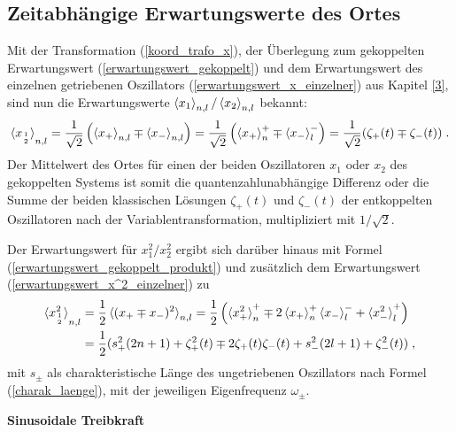   \subsection{Zeitabhängige Erwartungswerte des Ortes}
    Mit der Transformation (\ref{koord_trafo_x}), der Überlegung zum gekoppelten Erwartungswert (\ref{erwartungswert_gekoppelt}) und dem Erwartungswert des einzelnen getriebenen Oszillators (\ref{erwartungswert_x_einzelner}) aus Kapitel \ref{3}, sind nun die Erwartungswerte
    $\braket{x_1}_{n,l}/\braket{x_2}_{n,l}$ bekannt:
    \begin{align}
      \braket{x_{1 \atop 2}}_{n,l}=\frac{1}{\sqrt{2}}\left(\braket{x_+}_{n,l}\mp\braket{x_-}_{n,l}\right)
      =\frac{1}{\sqrt{2}}\left(\braket{x_+}_n^+\mp\braket{x_-}_l^-\right)
      =\frac{1}{\sqrt{2}}(\zeta_+(t)\mp\zeta_-(t)) \; .
    \end{align}
    Der Mittelwert des Ortes für einen der beiden Oszillatoren $x_1$ oder $x_2$ des gekoppelten Systems ist somit die quantenzahlunabhängige Differenz oder die Summe der beiden klassischen Lösungen $\zeta_+(t)$ und $\zeta_-(t)$ der entkoppelten Oszillatoren nach der Variablentransformation, multipliziert mit $1/\sqrt 2$.

    Der Erwartungswert für $x_{1}^2/x_2^2$ ergibt sich darüber hinaus mit Formel (\ref{erwartungswert_gekoppelt_produkt}) und zusätzlich dem Erwartungswert (\ref{erwartungswert_x^2_einzelner}) zu
    \begin{align}
      \braket{x_{1\atop 2}^2}_{n,l}&=\frac{1}{2}\braket{(x_+\mp x_-)^2}_{n,l}
      =\frac{1}{2}\left(\braket{x_+^2}_n^+ \mp 2\braket{x_+}_n^+\braket{x_-}_l^- + \braket{x_-^2}_l^+\right) \notag\\
      &=\frac 1 2 (s_+^2(2n+1)+\zeta_+^2(t) \mp 2\zeta_+(t)\zeta_-(t) + s_-^2(2l+1)+\zeta_-^2(t)) \; ,
    \end{align}
    mit $s_\pm$ als charakteristische Länge des ungetriebenen Oszillators nach Formel (\ref{charak_laenge}), mit der jeweiligen Eigenfrequenz $\omega_\pm$.

    \textbf{Sinusoidale Treibkraft}

